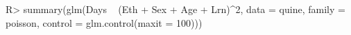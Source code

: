 \documentclass[article]{jss}
\begin{document}
\begin{CodeInput}
R> summary(glm(Days ~ (Eth + Sex + Age + Lrn)^2, data = quine, family = poisson, control = glm.control(maxit = 100)))
\end{CodeInput}
\end{document}
